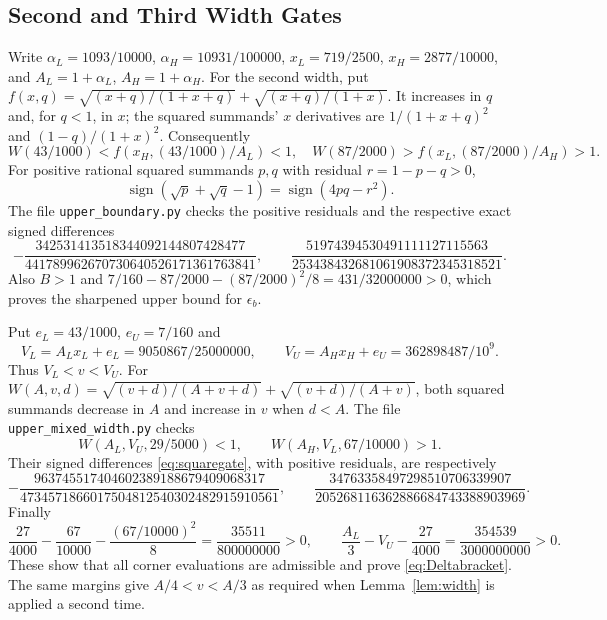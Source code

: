 \documentclass[11pt,letterpaper]{article}
\newcommand{\epsb}{\epsilon_b}
\begin{document}
\subsection{Second and Third Width Gates}
Write $\alpha_L=1093/10000$, $\alpha_H=10931/100000$,
$x_L=719/2500$, $x_H=2877/10000$, and $A_L=1+\alpha_L$,
$A_H=1+\alpha_H$.
For the second width, put
$f(x,q)=\sqrt{(x+q)/(1+x+q)}+\sqrt{(x+q)/(1+x)}$.
It increases in $q$ and, for $q<1$, in $x$; the squared summands'
$x$ derivatives are $1/(1+x+q)^2$ and $(1-q)/(1+x)^2$.
Consequently
\[
 W(43/1000)<f(x_H,(43/1000)/A_L)<1,
 \quad W(87/2000)>f(x_L,(87/2000)/A_H)>1.
\]
For positive rational squared summands $p,q$ with residual $r=1-p-q>0$,
\begin{equation}\label{eq:squaregate}
 \operatorname{sign}(\sqrt p+\sqrt q-1)
 =\operatorname{sign}(4pq-r^2).
\end{equation}
The file \texttt{upper\_boundary.py} checks the positive residuals and
the respective exact signed differences
\[
 -\frac{342531413518344092144807428477}{441789962670730640526171361763841},
 \qquad
 \frac{51974394530491111127115563}{253438432681061908372345318521}.
\]
Also $B>1$ and
$7/160-87/2000-(87/2000)^2/8=431/32000000>0$,
which proves the sharpened upper bound for $\epsb$.

Put $e_L=43/1000$, $e_U=7/160$ and
\[
 V_L=A_Lx_L+e_L=9050867/25000000,\qquad
 V_U=A_Hx_H+e_U=362898487/10^9.
\]
Thus $V_L<v<V_U$. For
$W(A,v,d)=\sqrt{(v+d)/(A+v+d)}+\sqrt{(v+d)/(A+v)}$,
both squared summands decrease in $A$ and increase in $v$ when $d<A$.
The file \texttt{upper\_mixed\_width.py} checks
\[
 W(A_L,V_U,29/5000)<1,\qquad W(A_H,V_L,67/10000)>1.
\]
Their signed differences \eqref{eq:squaregate}, with positive residuals,
are respectively
\[
 -\frac{963745517404602389188679409068317}{4734571866017504812540302482915910561},
 \qquad
 \frac{34763358497298510706339907}{205268116362886684743388903969}.
\]
Finally
\[
 \frac{27}{4000}-\frac{67}{10000}-\frac{(67/10000)^2}{8}
 =\frac{35511}{800000000}>0,\qquad
 \frac{A_L}3-V_U-\frac{27}{4000}
 =\frac{354539}{3000000000}>0.
\]
These show that all corner evaluations are admissible and prove
\eqref{eq:Deltabracket}. The same margins give $A/4<v<A/3$ as required
when Lemma~\ref{lem:width} is applied a second time.
\end{document}
